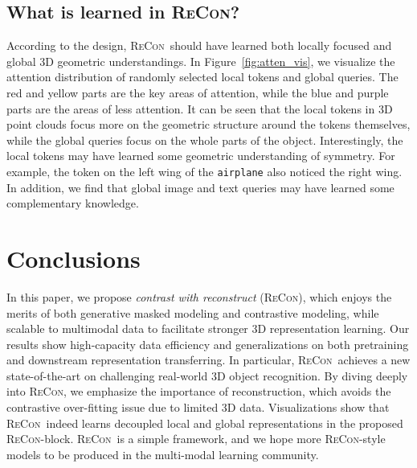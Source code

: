 \documentclass{article}
\theoremstyle{plain}
\theoremstyle{definition}
\theoremstyle{remark}
\def\recon{{\scshape ReCon}}
\begin{document}
\subsection{What is learned in \recon?}
\vspace{-4pt}
According to the design, \recon\ should have learned both locally focused and global 3D geometric understandings. 
In Figure~\ref{fig:atten_vis}, we visualize the attention distribution of randomly selected local tokens and global queries. 
The red and yellow parts are the key areas of attention, while the blue and purple parts are the areas of less attention.
It can be seen that the local tokens in 3D point clouds focus more on the geometric structure around the tokens themselves, while the global queries focus on the whole parts of the object. 
Interestingly, the local tokens may have learned some geometric understanding of symmetry.
For example, the token on the left wing of the \texttt{airplane} also noticed the right wing. 
In addition, we find that global image and text queries may have learned some complementary knowledge. \vspace{-6pt}
\section{Conclusions}
\vspace{-3pt}
In this paper, we propose \textit{contrast with reconstruct} (\recon), which enjoys the merits of both generative masked modeling and contrastive modeling, while scalable to multimodal data to facilitate stronger 3D representation learning.
Our results show high-capacity data efficiency and generalizations on both pretraining and downstream representation transferring.
In particular, \recon\ achieves a new state-of-the-art on challenging real-world 3D object recognition.
By diving deeply into \recon, we emphasize the importance of reconstruction, which avoids the contrastive over-fitting issue due to limited 3D data.
Visualizations show that \recon\ indeed learns decoupled local and global representations in the proposed \recon-block.
\recon\ is a simple framework, and we hope more \recon-style models to be produced in the multi-modal learning community.
 


{
\small

}
\end{document}

